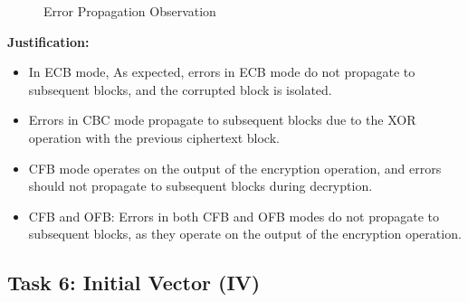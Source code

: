 \documentclass[a4paper]{article}
\begin{document}
\begin{figure}[h]
    \centering
    \hfill
    \hfill
    \hfill
    \hfill
    \caption{Error Propagation Observation}\label{fig:task5}
\end{figure}

\textbf{Justification:}
\begin{itemize}
    \item  In ECB mode, As expected, errors in ECB mode do not propagate to subsequent blocks, and the corrupted block is isolated.
    \item Errors in CBC mode propagate to subsequent blocks due to the XOR operation with the previous ciphertext block.
    \item CFB mode operates on the output of the encryption operation, and errors should not propagate to subsequent blocks during decryption.
    \item CFB and OFB: Errors in both CFB and OFB modes do not propagate to subsequent blocks, as they operate on the output of the encryption operation.
\end{itemize}

\subsection{Task 6: Initial Vector (IV)}
\end{document}
